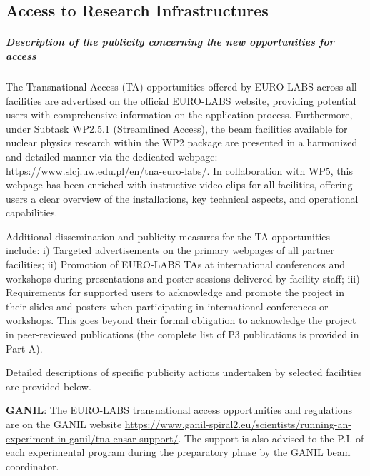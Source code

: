 \subsection{Access to Research Infrastructures}


\subparagraph{Description of the publicity concerning the new opportunities for access} \mbox{}

The Transnational Access (TA) opportunities offered by EURO-LABS across all facilities are advertised on the official EURO-LABS website, providing potential users with comprehensive information on the application process. Furthermore, under Subtask WP2.5.1 (Streamlined Access), the beam facilities available for nuclear physics research within the WP2 package are presented in a harmonized and detailed manner via the dedicated webpage: \url{https://www.slcj.uw.edu.pl/en/tna-euro-labs/}. In collaboration with WP5, this webpage has been enriched with instructive video clips for all facilities, offering users a clear overview of the installations, key technical aspects, and operational capabilities.

Additional dissemination and publicity measures for the TA opportunities include:
i) Targeted advertisements on the primary webpages of all partner facilities;
ii) Promotion of EURO-LABS TAs at international conferences and workshops during presentations and poster sessions delivered by facility staff;
iii) Requirements for supported users to acknowledge and promote the project in their slides and posters when participating in international conferences or workshops. This goes beyond their formal obligation to acknowledge the project in peer-reviewed publications (the complete list of P3 publications is provided in Part A).

Detailed descriptions of specific publicity actions undertaken by selected facilities are provided below.

\textbf{GANIL}: The EURO-LABS transnational access opportunities and regulations are  on the GANIL website \url{https://www.ganil-spiral2.eu/scientists/running-an-experiment-in-ganil/tna-ensar-support/}. The support is also advised to the P.I. of each experimental program during the preparatory phase by the GANIL beam coordinator.

